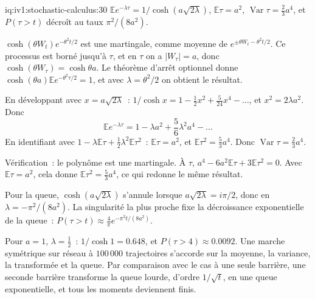 \begin{solution}{iq:iv1:stochastic-calculus:30}
$\mathbb{E}e^{-\lambda\tau} = 1/\cosh(a\sqrt{2\lambda})$, $\mathbb{E}\tau = a^2$, $\operatorname{Var}\tau = \frac23a^4$, et $P(\tau > t)$ décroît au taux $\pi^2/(8a^2)$.

$\cosh(\theta W_t)e^{-\theta^2t/2}$ est une martingale, comme moyenne de $e^{\pm\theta W_t - \theta^2t/2}$. Ce processus est borné jusqu'à $\tau$, et en $\tau$ on a $|W_\tau| = a$, donc $\cosh(\theta W_\tau) = \cosh\theta a$. Le théorème d'arrêt optionnel donne $\cosh(\theta a)\mathbb{E}e^{-\theta^2\tau/2} = 1$, et avec $\lambda = \theta^2/2$ on obtient le résultat.

En développant avec $x = a\sqrt{2\lambda}$~: $1/\cosh x = 1 - \frac12x^2 + \frac{5}{24}x^4 - \dots$, et $x^2 = 2\lambda a^2$. Donc
\[
\mathbb{E}e^{-\lambda\tau} = 1 - \lambda a^2 + \frac56\lambda^2a^4 - \dots
\]
En identifiant avec $1 - \lambda\mathbb{E}\tau + \frac12\lambda^2\mathbb{E}\tau^2$~: $\mathbb{E}\tau = a^2$, et $\mathbb{E}\tau^2 = \frac53a^4$. Donc $\operatorname{Var}\tau = \frac23a^4$.

Vérification~: le polynôme est une martingale. À $\tau$, $a^4 - 6a^2\mathbb{E}\tau + 3\mathbb{E}\tau^2 = 0$. Avec $\mathbb{E}\tau = a^2$, cela donne $\mathbb{E}\tau^2 = \frac53a^4$, ce qui redonne le même résultat.

Pour la queue, $\cosh(a\sqrt{2\lambda})$ s'annule lorsque $a\sqrt{2\lambda} = i\pi/2$, donc en $\lambda = -\pi^2/(8a^2)$. La singularité la plus proche fixe la décroissance exponentielle de la queue~: $P(\tau > t) \approx \frac{4}{\pi}e^{-\pi^2t/(8a^2)}$.

Pour $a = 1$, $\lambda = \frac12$~: $1/\cosh 1 = 0.648$, et $P(\tau > 4) \approx 0.0092$. Une marche symétrique sur réseau à $100\,000$ trajectoires s'accorde sur la moyenne, la variance, la transformée et la queue. Par comparaison avec le cas à une seule barrière, une seconde barrière transforme la queue lourde, d'ordre $1/\sqrt{t}$, en une queue exponentielle, et tous les moments deviennent finis.


\begin{sloppypar}\end{sloppypar}

\end{solution}
